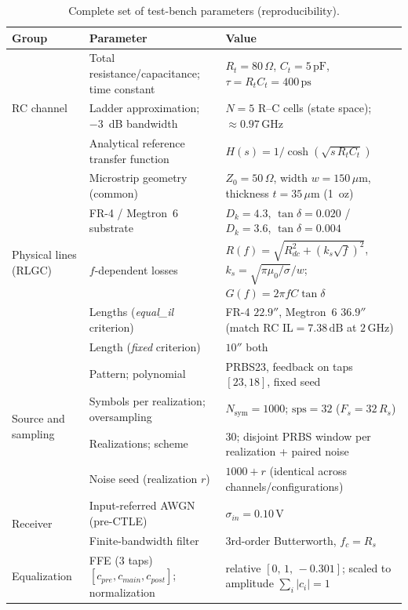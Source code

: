 \begin{table}[!t]
\caption{Complete set of test-bench parameters (reproducibility).}
\label{tab:params}
\centering
\footnotesize
\begin{tabular}{p{} p{} p{}}
\hline
\textbf{Group} & \textbf{Parameter} & \textbf{Value} \\
\hline
\multirow{3}{*}{RC channel}
 & Total resistance/capacitance; time constant & $R_t=80\,\Omega$, $C_t=5\,\mathrm{pF}$, $\tau=R_tC_t=400\,\mathrm{ps}$ \\
 & Ladder approximation; $-3$~dB bandwidth & $N=5$ R--C cells (state space); $\approx0.97\,\mathrm{GHz}$ \\
 & Analytical reference transfer function & $H(s)=1/\cosh(\sqrt{s\,R_tC_t})$ \\
\hline
\multirow{5}{*}{Physical lines (RLGC)}
 & Microstrip geometry (common) & $Z_0=50\,\Omega$, width $w=150\,\mu\mathrm{m}$, thickness $t=35\,\mu\mathrm{m}$ (1~oz) \\
 & FR-4 / Megtron~6 substrate & $D_k=4.3$, $\tan\delta=0.020$ / $D_k=3.6$, $\tan\delta=0.004$ \\
 & $f$-dependent losses & $R(f)=\sqrt{R_{dc}^2+(k_s\sqrt{f})^2}$, $k_s=\sqrt{\pi\mu_0/\sigma}/w$; $G(f)=2\pi f C\tan\delta$ \\
 & Lengths (\textit{equal\_il} criterion) & FR-4 $22.9''$, Megtron~6 $36.9''$ (match RC IL${=}7.38\,\mathrm{dB}$ at $2\,\mathrm{GHz}$) \\
 & Length (\textit{fixed} criterion) & $10''$ both \\
\hline
\multirow{4}{*}{Source and sampling}
 & Pattern; polynomial & PRBS23, feedback on taps $[23,18]$, fixed seed \\
 & Symbols per realization; oversampling & $N_{\mathrm{sym}}=1000$; $\mathrm{sps}=32$ ($F_s=32\,R_s$) \\
 & Realizations; scheme & $30$; disjoint PRBS window per realization + paired noise \\
 & Noise seed (realization $r$) & $1000+r$ (identical across channels/configurations) \\
\hline
\multirow{2}{*}{Receiver}
 & Input-referred AWGN (pre-CTLE) & $\sigma_{in}=0.10\,\mathrm{V}$ \\
 & Finite-bandwidth filter & 3rd-order Butterworth, $f_c=R_s$ \\
\hline
\multirow{3}{*}{Equalization}
 & FFE (3 taps) $[c_{pre},c_{main},c_{post}]$; normalization & relative $[0,\,1,\,-0.301]$; scaled to amplitude $\sum_i|c_i|=1$ \\

\end{tabular}
\end{table}
